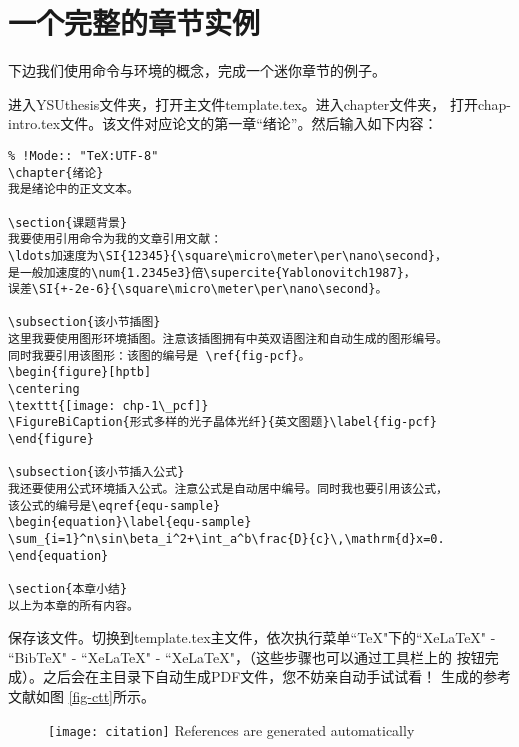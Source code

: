 \section{一个完整的章节实例}\label{section1-2}
下边我们使用命令与环境的概念，完成一个迷你章节的例子。

进入YSUthesis文件夹，打开主文件template.tex。进入chapter文件夹，
打开chap-intro.tex文件。该文件对应论文的第一章“绪论”。然后输入如下内容：
\begin{verbatim}
% !Mode:: "TeX:UTF-8"
\chapter{绪论}
我是绪论中的正文文本。

\section{课题背景}
我要使用引用命令为我的文章引用文献：
\ldots加速度为\SI{12345}{\square\micro\meter\per\nano\second}，
是一般加速度的\num{1.2345e3}倍\supercite{Yablonovitch1987}，
误差\SI{+-2e-6}{\square\micro\meter\per\nano\second}。

\subsection{该小节插图}
这里我要使用图形环境插图。注意该插图拥有中英双语图注和自动生成的图形编号。
同时我要引用该图形：该图的编号是 \ref{fig-pcf}。
\begin{figure}[hptb]
\centering
\texttt{[image: chp-1\_pcf]}
\FigureBiCaption{形式多样的光子晶体光纤}{英文图题}\label{fig-pcf}
\end{figure}

\subsection{该小节插入公式}
我还要使用公式环境插入公式。注意公式是自动居中编号。同时我也要引用该公式，
该公式的编号是\eqref{equ-sample}
\begin{equation}\label{equ-sample}
\sum_{i=1}^n\sin\beta_i^2+\int_a^b\frac{D}{c}\,\mathrm{d}x=0.
\end{equation}

\section{本章小结}
以上为本章的所有内容。
\end{verbatim}
保存该文件。切换到template.tex主文件，依次执行菜单``TeX"下的``XeLaTeX" 
- ``BibTeX" - ``XeLaTeX" - ``XeLaTeX"，（这些步骤也可以通过工具栏上的
按钮完成）。之后会在主目录下自动生成PDF文件，您不妨亲自动手试试看！
生成的参考文献如图 \ref {fig-ctt}所示。
\begin{figure}[hptb]
 \centering
 \texttt{[image: citation]}
{References are generated automatically}\vspace{0.3em}
\end{figure}

